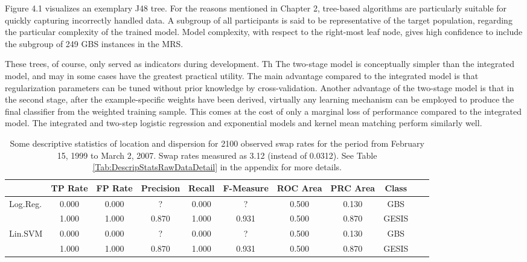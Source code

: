 Figure 4.1 visualizes an exemplary J48 tree. For the reasons mentioned in Chapter 2, tree-based algorithms are particularly suitable for quickly capturing incorrectly handled data. A subgroup of all participants is said to be representative of the target population, regarding the particular complexity of the trained model. Model complexity, with respect to the right-most leaf node, gives high confidence to include the subgroup of 249 GBS instances in the MRS.

These trees, of course, only served as indicators during development. Th
The two-stage model is conceptually simpler than the integrated model, and may in some cases have the greatest practical utility. The main advantage compared to the integrated model is that regularization parameters can be tuned without prior knowledge by cross-validation. Another advantage of the two-stage model is that in the second stage, after the example-speciﬁc weights have been derived, virtually any learning mechanism can be employed to produce the ﬁnal classiﬁer from the weighted training sample. This comes at the cost of only a marginal loss of performance compared to the integrated model. The integrated and two-step logistic regression and exponential models and kernel mean matching perform similarly well.

\begin{table}[ht]
    \begin{center}
		\captionsetup{width= 430pt}
            {\footnotesize
            \begin{tabular}{l|cccccccccc}
                \hline \hline
                           &  TP Rate & FP Rate & Precision & Recall & F-Measure & ROC Area & PRC Area & Class \\
                \hline
                      Log.Reg. & 0.000 & 0.000 & ? & 0.000 & ? & 0.500 & 0.130 & GBS &\\
                      & 1.000 & 1.000 & 0.870 & 1.000 & 0.931 & 0.500 & 0.870 & GESIS &\\
                \hline \hline
     Lin.SVM & 0.000 & 0.000 & ? & 0.000 & ? & 0.500 & 0.130 & GBS &\\
                      & 1.000 & 1.000 & 0.870 & 1.000 & 0.931 & 0.500 & 0.870 & GESIS &\\
                		
\end{tabular}}
        \caption{Some descriptive statistics of location and dispersion for 2100 observed swap rates for the period from February 15, 1999 to March 2, 2007. Swap rates measured as 3.12 (instead of 0.0312). See Table \ref{Tab:DescripStatsRawDataDetail} in the appendix for more details.}
\label{Tab:DescripStatsRawData}
\end{center}
\end{table}

